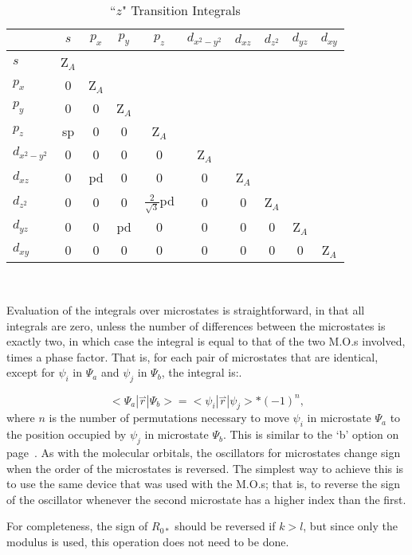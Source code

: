 \begin{table}
\caption{\label{transz} ``$z$" Transition Integrals}
\begin{center}

\begin{tabular}{l|ccccccccc} \hline
& $s$  &  $p_x$  &  $p_y$  &  $p_z$  &  $d_{x^2-y^2}$  & $d_{xz}$  &
$d_{z^2}$  &  $d_{yz}$  &  $d_{xy}$ \\ \hline
$s$ & Z$_A$\\
$p_x$ & 0 & Z$_A$\\
$p_y$  & 0 & 0 & Z$_A$ \\
$p_z$  & sp & 0 & 0 & Z$_A$\\
$d_{x^2-y^2}$ & 0 & 0 & 0 & 0 & Z$_A$\\
$d_{xz}$      & 0 & pd & 0 & 0 & 0 & Z$_A$\\
$d_{z^2}$     & 0 & 0 & 0 & $\frac{2}{\sqrt{3}}$pd & 0 & 0 & Z$_A$\\
$d_{yz}$      & 0 & 0 & pd & 0 & 0 & 0 & 0 & Z$_A$\\
$d_{xy}$      & 0 & 0 & 0 & 0 & 0 & 0 & 0 & 0 & Z$_A$\\  \hline
\end{tabular}\\
\end{center}
\end{table}


  Evaluation of the integrals over microstates is straightforward,
in that all integrals are zero, unless the number of differences between the microstates is exactly two,
in which case the integral is equal to that of the two M.O.s involved, times a phase factor.  That is,
for each pair of microstates that are identical, except for $\psi_i$
in $\Psi_a$ and  $\psi_j$ in $\Psi_b$, the integral is:.

$$
<\! \Psi_a|\stackrel{\rightharpoonup}{r}|\Psi_b\! > =<\! \psi_i|\stackrel{\rightharpoonup}{r}|\psi_j\! >*(-1)^n,
$$
where $n$ is the number of permutations necessary to move $\psi_i$ in microstate $\Psi_a$ to the position
occupied by $\psi_j$ in microstate $\Psi_b$. This is
similar to the `b' option on page~\pageref{b}.  As with
the molecular orbitals, the oscillators for microstates change sign
when the order of the microstates is reversed.  The simplest way to
achieve this is to use the same device that was used with the M.O.s;
that is, to reverse the sign of the oscillator whenever the second
microstate has a higher index than the first.


For completeness, the sign of $R_{0*}$ should be reversed if $k>l$, but
since only the modulus is used, this operation does not need to be done.


